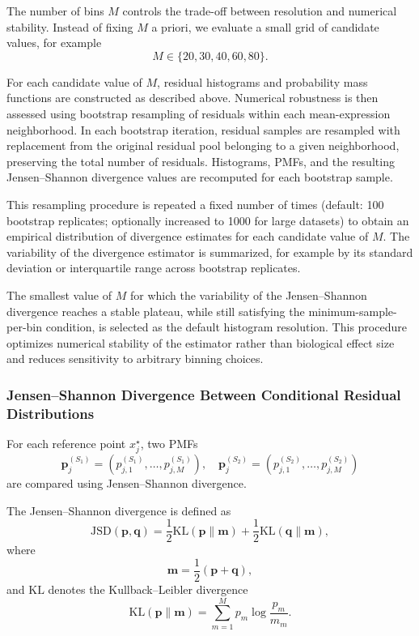 The number of bins $M$ controls the trade-off between resolution and numerical stability. Instead of fixing $M$ a priori, we evaluate a small grid of candidate values, for example
\[
M \in \{20, 30, 40, 60, 80\}.
\]

For each candidate value of $M$, residual histograms and probability mass functions are constructed as described above. Numerical robustness is then assessed using bootstrap resampling of residuals within each mean-expression neighborhood. In each bootstrap iteration, residual samples are resampled with replacement from the original residual pool belonging to a given neighborhood, preserving the total number of residuals. Histograms, PMFs, and the resulting Jensen--Shannon divergence values are recomputed for each bootstrap sample.

This resampling procedure is repeated a fixed number of times (default: 100 bootstrap replicates; optionally increased to 1000 for large datasets) to obtain an empirical distribution of divergence estimates for each candidate value of $M$. The variability of the divergence estimator is summarized, for example by its standard deviation or interquartile range across bootstrap replicates.

The smallest value of $M$ for which the variability of the Jensen--Shannon divergence reaches a stable plateau, while still satisfying the minimum-sample-per-bin condition, is selected as the default histogram resolution. This procedure optimizes numerical stability of the estimator rather than biological effect size and reduces sensitivity to arbitrary binning choices.

\subsubsection{Jensen--Shannon Divergence Between Conditional Residual Distributions}

For each reference point $x^\star_j$, two PMFs
\[
\mathbf{p}^{(S_1)}_j = (p^{(S_1)}_{j,1}, \ldots, p^{(S_1)}_{j,M}), \quad
\mathbf{p}^{(S_2)}_j = (p^{(S_2)}_{j,1}, \ldots, p^{(S_2)}_{j,M})
\]
are compared using Jensen--Shannon divergence.

The Jensen--Shannon divergence is defined as
\[
\mathrm{JSD}(\mathbf{p}, \mathbf{q}) =
\frac{1}{2}\mathrm{KL}(\mathbf{p} \parallel \mathbf{m}) +
\frac{1}{2}\mathrm{KL}(\mathbf{q} \parallel \mathbf{m}),
\]
where
\[
\mathbf{m} = \frac{1}{2}(\mathbf{p} + \mathbf{q}),
\]
and $\mathrm{KL}$ denotes the Kullback--Leibler divergence
\[
\mathrm{KL}(\mathbf{p} \parallel \mathbf{m}) =
\sum_{m=1}^{M} p_m \log \frac{p_m}{m_m}.
\]

